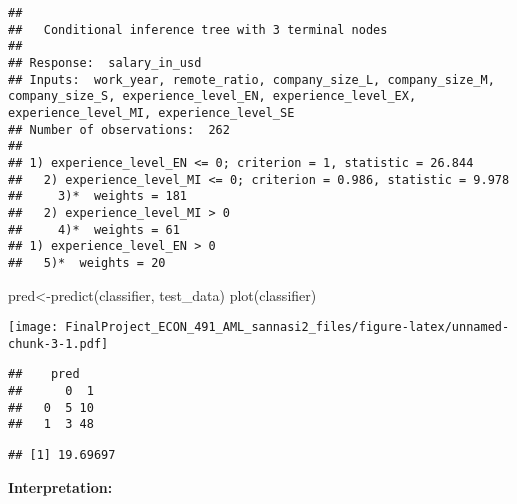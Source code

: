 \documentclass[
]{article}
\newenvironment{Shaded}{\begin{snugshade}}{\end{snugshade}}
\newcommand{\DecValTok}[1]{\textcolor[rgb]{0.00,0.00,0.81}{#1}}
\newcommand{\FunctionTok}[1]{\textcolor[rgb]{0.00,0.00,0.00}{#1}}
\newcommand{\NormalTok}[1]{#1}
\newcommand{\OtherTok}[1]{\textcolor[rgb]{0.56,0.35,0.01}{#1}}
\newcommand{\SpecialCharTok}[1]{\textcolor[rgb]{0.00,0.00,0.00}{#1}}
\begin{document}
\begin{verbatim}
## 
##   Conditional inference tree with 3 terminal nodes
## 
## Response:  salary_in_usd 
## Inputs:  work_year, remote_ratio, company_size_L, company_size_M, company_size_S, experience_level_EN, experience_level_EX, experience_level_MI, experience_level_SE 
## Number of observations:  262 
## 
## 1) experience_level_EN <= 0; criterion = 1, statistic = 26.844
##   2) experience_level_MI <= 0; criterion = 0.986, statistic = 9.978
##     3)*  weights = 181 
##   2) experience_level_MI > 0
##     4)*  weights = 61 
## 1) experience_level_EN > 0
##   5)*  weights = 20
\end{verbatim}

\begin{Shaded}
\begin{Highlighting}[]
\NormalTok{pred}\OtherTok{\textless{}{-}}\FunctionTok{predict}\NormalTok{(classifier, test\_data)}
\FunctionTok{plot}\NormalTok{(classifier)}
\end{Highlighting}
\end{Shaded}

\texttt{[image: FinalProject\_ECON\_491\_AML\_sannasi2\_files/figure-latex/unnamed-chunk-3-1.pdf]}

\begin{Shaded}
\end{Shaded}

\begin{verbatim}
##    pred
##      0  1
##   0  5 10
##   1  3 48
\end{verbatim}

\begin{Shaded}
\end{Shaded}

\begin{verbatim}
## [1] 19.69697
\end{verbatim}

\textbf{Interpretation:}
\end{document}
